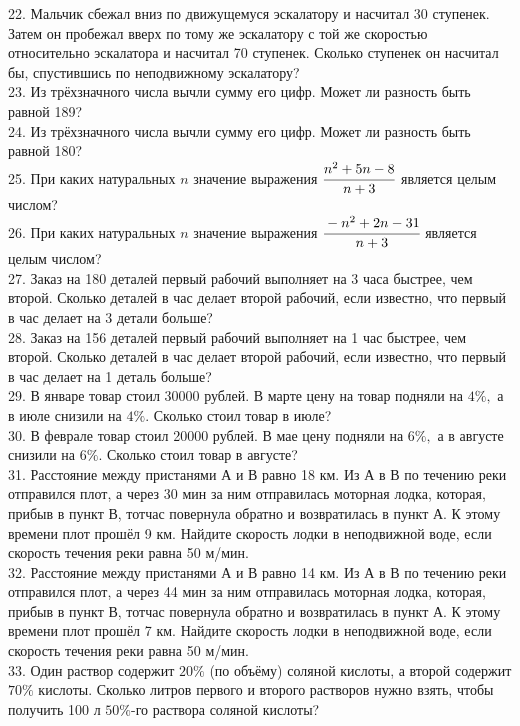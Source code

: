 22. Мальчик сбежал вниз по движущемуся эскалатору и насчитал 30 ступенек. Затем он пробежал вверх по тому же эскалатору с той же скоростью относительно эскалатора и насчитал 70 ступенек. Сколько ступенек он насчитал бы, спустившись по неподвижному эскалатору?\\
23. Из трёхзначного числа вычли сумму его цифр. Может ли разность быть равной 189?\\
24. Из трёхзначного числа вычли сумму его цифр. Может ли разность быть равной 180?\\
25. При каких натуральных $n$ значение выражения $\cfrac{n^2+5n-8}{n+3}$ является целым числом?\\
26. При каких натуральных $n$ значение выражения $\cfrac{-n^2+2n-31}{n+3}$ является целым числом?\\
27. Заказ на 180 деталей первый рабочий выполняет на 3 часа быстрее, чем второй. Сколько деталей в час делает второй рабочий, если известно, что первый в час делает на 3 детали больше?\\
28. Заказ на 156 деталей первый рабочий выполняет на 1 час быстрее, чем второй. Сколько деталей в час делает второй рабочий, если известно, что первый в час делает на 1 деталь больше?\\
29. В январе товар стоил 30000 рублей. В марте цену на товар подняли на $4\%,$ а в июле снизили на $4\%.$ Сколько стоил товар в июле?\\
30. В феврале товар стоил 20000 рублей. В мае цену подняли на $6\%,$ а в августе снизили
на $6\%.$ Сколько стоил товар в августе?\\
31. Расстояние между пристанями А и В равно 18 км. Из А в В по течению реки отправился плот, а через 30 мин за ним отправилась моторная лодка, которая, прибыв в пункт В, тотчас повернула обратно и возвратилась в пункт А. К этому времени плот прошёл 9 км. Найдите скорость лодки в неподвижной воде, если скорость течения реки равна 50 м/мин.\\
32. Расстояние между пристанями А и В равно 14 км. Из А в В по течению реки отправился плот, а через 44 мин за ним отправилась моторная лодка, которая, прибыв в пункт В, тотчас повернула обратно и возвратилась в пункт А. К этому времени плот прошёл 7 км. Найдите скорость лодки в неподвижной воде, если скорость течения реки равна 50 м/мин.\\
33. Один раствор содержит $20\%$ (по объёму) соляной кислоты, а второй содержит $70\%$ кислоты. Сколько литров первого и второго растворов нужно взять, чтобы получить 100 л $50\%$-го раствора соляной кислоты?\\
